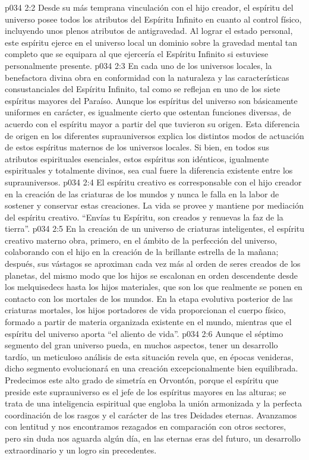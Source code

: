 \vs p034 2:2 Desde su más temprana vinculación con el hijo creador, el espíritu del universo posee todos los atributos del Espíritu Infinito en cuanto al control físico, incluyendo unos plenos atributos de antigravedad. Al lograr el estado personal, este espíritu ejerce en el universo local un dominio sobre la gravedad mental tan completo que se equipara al que ejercería el Espíritu Infinito si estuviese personalmente presente.
\vs p034 2:3 \pc En cada uno de los universos locales, la benefactora divina obra en conformidad con la naturaleza y las características consustanciales del Espíritu Infinito, tal como se reflejan en uno de los siete espíritus mayores del Paraíso. Aunque los espíritus del universo son básicamente uniformes en carácter, es igualmente cierto que ostentan funciones diversas, de acuerdo con el espíritu mayor a partir del que tuvieron su origen. Esta diferencia de origen en los diferentes suprauniversos explica los distintos modos de actuación de estos espíritus maternos de los universos locales. Si bien, en todos sus atributos espirituales esenciales, estos espíritus son idénticos, igualmente espirituales y totalmente divinos, sea cual fuere la diferencia existente entre los suprauniversos.
\vs p034 2:4 \pc El espíritu creativo es corresponsable con el hijo creador en la creación de las criaturas de los mundos y nunca le falla en la labor de sostener y conservar estas creaciones. La vida se provee y mantiene por mediación del espíritu creativo. “Envías tu Espíritu, son creados y renuevas la faz de la tierra”.
\vs p034 2:5 En la creación de un universo de criaturas inteligentes, el espíritu creativo materno obra, primero, en el ámbito de la perfección del universo, colaborando con el hijo en la creación de la brillante estrella de la mañana; después, sus vástagos se aproximan cada vez más al orden de seres creados de los planetas, del mismo modo que los hijos se escalonan en orden descendente desde los melquisedecs hasta los hijos materiales, que son los que realmente se ponen en contacto con los mortales de los mundos. En la etapa evolutiva posterior de las criaturas mortales, los hijos portadores de vida proporcionan el cuerpo físico, formado a partir de materia organizada existente en el mundo, mientras que el espíritu del universo aporta “el aliento de vida”.
\vs p034 2:6 \pc Aunque el séptimo segmento del gran universo pueda, en muchos aspectos, tener un desarrollo tardío, un meticuloso análisis de esta situación revela que, en épocas venideras, dicho segmento evolucionará en una creación excepcionalmente bien equilibrada. Predecimos este alto grado de simetría en Orvontón, porque el espíritu que preside este suprauniverso es el jefe de los espíritus mayores en las alturas; se trata de una inteligencia espiritual que engloba la unión armonizada y la perfecta coordinación de los rasgos y el carácter de las tres Deidades eternas. Avanzamos con lentitud y nos encontramos rezagados en comparación con otros sectores, pero sin duda nos aguarda algún día, en las eternas eras del futuro, un desarrollo extraordinario y un logro sin precedentes.
